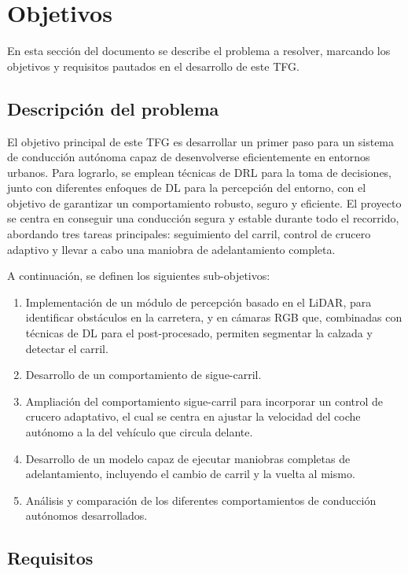 \chapter{Objetivos}
\label{cap:capitulo2}

En esta sección del documento se describe el problema a resolver, marcando los objetivos y requisitos pautados en el desarrollo de este \ac{TFG}.

\section{Descripción del problema}
\label{sec:descripcion}

El objetivo principal de este \ac{TFG} es desarrollar un primer paso para un sistema de conducción autónoma capaz de desenvolverse eficientemente en entornos urbanos. Para lograrlo, se emplean técnicas de \ac{DRL} para la toma de decisiones, junto con diferentes enfoques de \ac{DL} para la percepción del entorno, con el objetivo de garantizar un comportamiento robusto, seguro y eficiente. El proyecto se centra en conseguir una conducción segura y estable durante todo el recorrido, abordando tres tareas principales: seguimiento del carril, control de crucero adaptivo y llevar a cabo una maniobra de adelantamiento completa.

A continuación, se definen los siguientes sub-objetivos: 

\begin{enumerate}
\item Implementación de un módulo de percepción basado en el \ac{LiDAR}, para identificar obstáculos en la carretera, y en cámaras RGB que, combinadas con técnicas de \ac{DL} para el post-procesado, permiten segmentar la calzada y detectar el carril.
\item Desarrollo de un comportamiento de sigue-carril.
\item Ampliación del comportamiento sigue-carril para incorporar un control de crucero adaptativo, el cual se centra en ajustar la velocidad del coche autónomo a la del vehículo que circula delante.
\item Desarrollo de un modelo capaz de ejecutar maniobras completas de adelantamiento, incluyendo el cambio de carril y la vuelta al mismo.
\item Análisis y comparación de los diferentes comportamientos de conducción autónomos desarrollados.
\end{enumerate}

\section{Requisitos}
\label{sec:requisitos}

